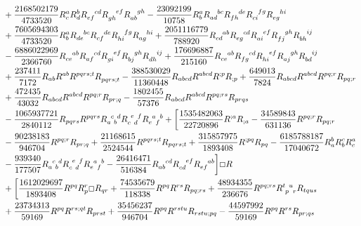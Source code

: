 \documentclass[11pt]{article}
\begin{document}
{\begin{align}
&+ \frac{2168502179}{4733520} R_c^a R_d ^b \tensor{R}{_{ef}^{cd}}\tensor{R}{_{gh}^{ef}} \tensor{R}{_{ab}^{gh}} - \frac{23092199}{10758} R_b^a \tensor{R}{_{ad}^{bc}} \tensor{R}{_{fh}^{de}}\tensor{R}{_{c i}^{fg}} \tensor{R}{_{eg}^{hi}}  
\nonumber
\\
&+ \frac{7605694303}{4733520} R_b^a \tensor{R}{_{de}^{bc}}\tensor{R}{_{cf}^{de}} \tensor{R}{_{hi}^{fg}} \tensor{R}{_{ag}^{hi}}  + \frac{2051116779}{788920} \tensor{R}{_{cd}^{ab}} \tensor{R}{_{eg}^{cd}} \tensor{R}{_{ai}^{ef}} \tensor{R}{_{fj}^{gh}} \tensor{R}{_{bh}^{ij}} 
\nonumber
\\
&- \frac{6886022969}{2366760}  \tensor{R}{_{ce}^{ab}} \tensor{R}{_{af}^{cd}} \tensor{R}{_{gi}^{ef}} \tensor{R}{_{bj}^{gh}} \tensor{R}{_{dh}^{ij}}  + \frac{176696887}{215160} \tensor{R}{_{ce}^{ab}} \tensor{R}{_{fg}^{cd}} \tensor{R}{_{hi}^{ef}} \tensor{R}{_{aj}^{gh}} \tensor{R}{_{bd}^{ij}} 
\nonumber
\\
&+ \frac{237411}{7172} R_{ab}R^{ab} \tensor{R}{^{pqrs;t}} \tensor{R}{_{pqrs;t}} - \frac{388530029}{11360448} R_{abcd} R^{abcd} R^{;p}R_{;p}  + \frac{649013}{7824} R_{abcd} R^{abcd} R^{pq;r}R_{pq;r} 
\nonumber
\\
&+ \frac{472435}{43032} R_{abcd} R^{abcd} R^{pq;r} R_{pr;q} - \frac{1802455}{57376} R_{abcd} R^{abcd} R^{pq;rs} R_{p r q s} 
\nonumber
\\
&- \frac{1065937721}{2840112} R_{pqrs} R^{pqrs} \tensor{R}{_a^c_b^d} \tensor{R}{_c^e_d^f}\tensor{R}{_e^a_f^b} + \bigg[ \frac{1535482063}{22720896}R^{;a} R_{;a}  - \frac{34589843}{631136}  R^{pq;r} R_{pq;r}  
\nonumber
\\
& - \frac{90238183}{946704} R^{pq;r} R_{pr;q}    + \frac{21168615}{2524544} R^{pqrs;t} R_{pqrs;t}   + \frac{315857975}{1893408} R^{;pq} R_{pq}   - \frac{6185788187}{17040672} R_a^b R_b^c R_c^a 
\nonumber
\\
&- \frac{939340}{177507} \tensor{R}{_a^c_b^d} \tensor{R}{_c^e_d^f}\tensor{R}{_e^a_f^b}  - \frac{26416471}{516384} \tensor{R}{_{ab}^{cd}} \tensor{R}{_{cd}^{ef}} \tensor{R}{_{ef}^{ab}}\bigg] \Box R 
\nonumber
\\
&+ \bigg[ \frac{1612029697}{1893408}  R^{pq}R_p^r \Box R_{qr} + \frac{74535679}{118338} R^{p q} R^{r s} R_{pq ; rs} + \frac{48934355}{236676} R^{p q ; rs} \tensor{R}{^t_p^u_r} R_{t q u s}
\nonumber
\\
&+\frac{23734313}{59169} R^{pq} R^{rs;qt} R_{p r s t}+\frac{35456237}{946704} R^{pq} R^{r s t u} R_{r s t u ;p q}-\frac{44597992 }{59169} R^{pq} R^{rs} R_{p r ; q s} 
\nonumber
\\

\end{align}}
\end{document}
